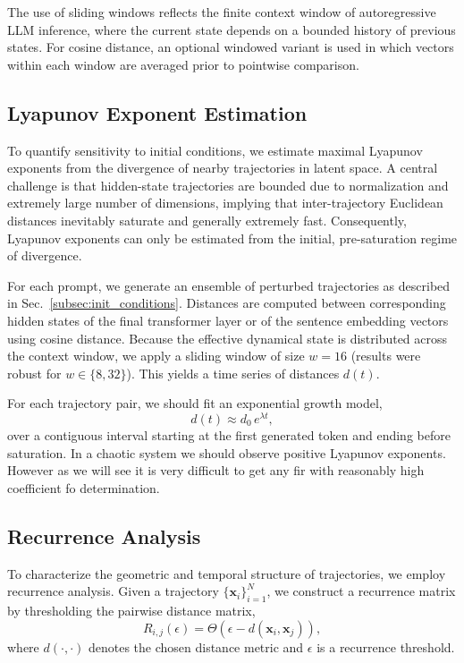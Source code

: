 \documentclass[aip%
 aip,
 amsmath,amssymb,
 reprint,%
]{revtex4-1}
\begin{document}
The use of sliding windows reflects the finite context window of autoregressive LLM inference, where the current state depends on a bounded history of previous states. For cosine distance, an optional windowed variant is used in which vectors within each window are averaged prior to pointwise comparison.

\subsection{Lyapunov Exponent Estimation}
\label{subsec:methods_lyapu}

To quantify sensitivity to initial conditions, we estimate maximal Lyapunov exponents from the divergence of nearby trajectories in latent space. A central challenge is that hidden-state trajectories are bounded due to normalization and extremely large number of dimensions, implying that inter-trajectory Euclidean distances inevitably saturate and generally extremely fast. Consequently, Lyapunov exponents can only be estimated from the initial, pre-saturation regime of divergence.

For each prompt, we generate an ensemble of perturbed trajectories as described in Sec.~\ref{subsec:init_conditions}. Distances are computed between corresponding hidden states of the final transformer layer or of the sentence embedding vectors using cosine distance. Because the effective dynamical state is distributed across the context window, we apply a sliding window of size $w=16$ (results were robust for $w\in\{8,32\}$). This yields a time series of distances $d(t)$.

For each trajectory pair, we should fit an exponential growth model,
\begin{equation}
d(t) \approx d_0 \, e^{\lambda t},
\end{equation}
over a contiguous interval starting at the first generated token and ending before saturation. In a chaotic system we should observe positive Lyapunov exponents. However as we will see it is very difficult to get any fir with reasonably high coefficient fo determination.

\subsection{Recurrence Analysis}
\label{subsec:recurrence_analysis_methods}

To characterize the geometric and temporal structure of trajectories, we employ recurrence analysis. Given a trajectory $\{\mathbf{x}_i\}_{i=1}^N$, we construct a recurrence matrix by thresholding the pairwise distance matrix,
\begin{equation}
R_{i,j}(\epsilon)
=
\Theta\!\left(\epsilon - d(\mathbf{x}_i,\mathbf{x}_j)\right),
\end{equation}
where $d(\cdot,\cdot)$ denotes the chosen distance metric and $\epsilon$ is a recurrence threshold.
\end{document}
